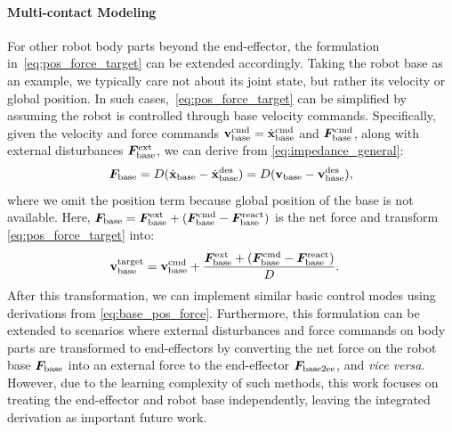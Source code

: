 \documentclass{article}
\begin{document}
\paragraph{Multi-contact Modeling}\label{sec:method:base_formulation} 
For other robot body parts beyond the end-effector, the formulation in~\cref{eq:pos_force_target} can be extended accordingly. Taking the robot base as an example, we typically care not about its joint state, but rather its velocity or global position. In such cases,~\cref{eq:pos_force_target} can be simplified by assuming the robot is controlled through base velocity commands. Specifically, given the velocity and force commands ${\mathbf{v}}_{\text{base}}^{\text{cmd}} = \dot{{\mathbf{x}}}_{\text{base}}^{\text{cmd}}$ and ${\bm{F}}^{\text{cmd}}_{\text{base}}$, along with external disturbances ${\bm{F}}^{\text{ext}}_{\text{base}}$, we can derive from \cref{eq:impedance_general}:
    \begin{equation}
        {\bm{F}}_{\text{base}} = D(\dot{{\mathbf{x}}}_{\text{base}} - \dot{{\mathbf{x}}}_{\text{base}}^{\text{des}}) = D({\mathbf{v}}_{\text{base}} - {\mathbf{v}}_{\text{base}}^{\text{des}}),
        \label{eq:base_simplification}
    \end{equation}
where we omit the position term because global position of the base is not available.
Here, ${\bm{F}}_{\text{base}} = {\bm{F}}_{\text{base}}^{\text{ext}} + ({\bm{F}}_{\text{base}}^{\text{cmd}} - {\bm{F}}_{\text{base}}^{\text{react}})$ is the net force and transform \cref{eq:pos_force_target} into:
\begin{equation}
    \begin{aligned}
    {\mathbf{v}}_{\text{base}}^{\text{target}} & = {\mathbf{v}}^{\text{cmd}}_{\text{base}} + \frac{{\bm{F}}_{\text{base}}^{\text{ext}} + ({\bm{F}}_{\text{base}}^{\text{cmd}} - {\bm{F}}_{\text{base}}^{\text{react}})}{D}.
    \end{aligned}
    \label{eq:base_pos_force}
\end{equation}
After this transformation, we can implement similar basic control modes using derivations from \cref{eq:base_pos_force}. Furthermore, this formulation can be extended to scenarios where external disturbances and force commands on body parts are transformed to end-effectors by converting the net force on the robot base ${\bm{F}}_{\text{base}}$ into an external force to the end-effector ${\bm{F}}_{\text{base}2{\text{ee}}}$, and \textit{vice versa}. However, due to the learning complexity of such methods, this work focuses on treating the end-effector and robot base independently, leaving the integrated derivation as important future work.
\end{document}
